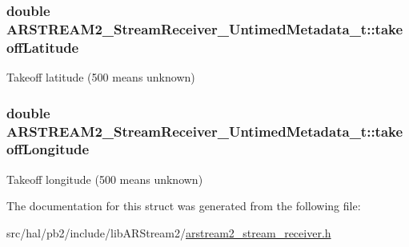 \subsubsection[{\texorpdfstring{takeoff\+Latitude}{takeoffLatitude}}]{\setlength{\rightskip}{0pt plus 5cm}double A\+R\+S\+T\+R\+E\+A\+M2\+\_\+\+Stream\+Receiver\+\_\+\+Untimed\+Metadata\+\_\+t\+::takeoff\+Latitude}\hypertarget{struct_a_r_s_t_r_e_a_m2___stream_receiver___untimed_metadata__t_a66d003202dc8dd76664e8268c1c6e5ba}{}\label{struct_a_r_s_t_r_e_a_m2___stream_receiver___untimed_metadata__t_a66d003202dc8dd76664e8268c1c6e5ba}
Takeoff latitude (500 means unknown) 
\subsubsection[{\texorpdfstring{takeoff\+Longitude}{takeoffLongitude}}]{\setlength{\rightskip}{0pt plus 5cm}double A\+R\+S\+T\+R\+E\+A\+M2\+\_\+\+Stream\+Receiver\+\_\+\+Untimed\+Metadata\+\_\+t\+::takeoff\+Longitude}\hypertarget{struct_a_r_s_t_r_e_a_m2___stream_receiver___untimed_metadata__t_a1dbd8295b643374ed9faca556772127d}{}\label{struct_a_r_s_t_r_e_a_m2___stream_receiver___untimed_metadata__t_a1dbd8295b643374ed9faca556772127d}
Takeoff longitude (500 means unknown) 

The documentation for this struct was generated from the following file\+:\begin{DoxyCompactItemize}
\item 
src/hal/pb2/include/lib\+A\+R\+Stream2/\hyperlink{arstream2__stream__receiver_8h}{arstream2\+\_\+stream\+\_\+receiver.\+h}\end{DoxyCompactItemize}
